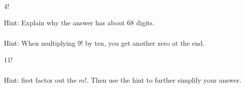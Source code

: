 \subsubsection*{ \answers}
    \begin{apart}
        \item $4!$
        \item Hint: Explain why the answer has about 68 digits.
    \end{apart}
    
\subsubsection*{ \answers}
    \begin{apart}
        \item Hint: When multiplying $9!$ by ten, you get another zero at the end.
        \item $11!$
    \end{apart}
    
\subsubsection*{ \answers}
Hint: first factor out the $m!$.  Then use the hint to further simplify your answer.








